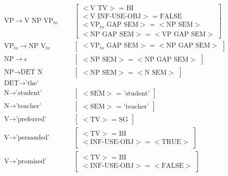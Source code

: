 \documentclass{article}
\begin{document}
\begin{enumerate}
\begin{align*}
\text{VP} \rightarrow \text{V NP VP}_{to} & & & \left  [ \begin{array}{c} <\text{V TV}>\text{ = } \text{BI} \\ <\text{V INF-USE-OBJ}>\text{ = } \text{FALSE} \\ <\text{VP}_{to} \text{ GAP SEM}> \text{ = } <\text{NP SEM}> \\ <\text{NP GAP SEM}> \text{ = } <\text{VP GAP SEM}> \end{array} \right ] \\
\text{VP}_{to} \rightarrow \text{NP V}_{to} &  & & \left  [ \begin{array}{c} <\text{VP}_{to} \text{ GAP SEM}>\text{ = } <\text{NP GAP SEM}>  \end{array} \right ] \\
\text{NP} \rightarrow \epsilon &  & & \left  [ \begin{array}{c} <\text{NP SEM}>\text{ = } <\text{NP GAP SEM}>  \end{array} \right ] \\
\text{NP} \rightarrow \text{DET N} &  & & \left  [ \begin{array}{c} <\text{NP SEM}>\text{ = } <\text{N SEM}>  \end{array} \right ] \\
\text{DET} \rightarrow \text{'the'} &  & &  \\
\text{N} \rightarrow \text{'student'} &  & &   \left  [ \begin{array}{c} <\text{SEM}>\text{ = } \text{'student'}  \end{array} \right ] \\
\text{N} \rightarrow \text{'teacher'} &  & &  \left  [ \begin{array}{c} <\text{SEM}>\text{ = } \text{'teacher'}  \end{array} \right ] \\
\text{V} \rightarrow \text{'preferred'} &  & &  \left  [ \begin{array}{c} <\text{TV}>\text{ = } \text{SG}  \end{array} \right ] \\
\text{V} \rightarrow \text{'persauded'} &  & &  \left  [ \begin{array}{c} <\text{TV}>\text{ = } \text{BI} \\ <\text{INF-USE-OBJ}> \text{ = } <\text{TRUE}> \end{array} \right ] \\
\text{V} \rightarrow \text{'promised'} &  & &  \left  [ \begin{array}{c} <\text{TV}>\text{ = } \text{BI} \\ <\text{INF-USE-OBJ}> \text{ = } <\text{FALSE}> \end{array} \right ] \\

\end{align*}
\end{enumerate}
\end{document}
